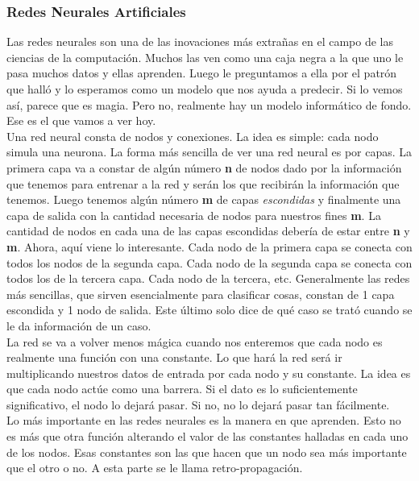 \documentclass[10pt,letterpaper]{article}
\begin{document}
\subsubsection{Redes Neurales Artificiales}
Las redes neurales son una de las inovaciones m\'as extra\~nas en el campo de las ciencias de la computaci\'on. Muchos las ven como una caja negra a la que uno le pasa muchos datos y ellas aprenden. Luego le preguntamos a ella por el patr\'on que hall\'o y lo esperamos como un modelo que nos ayuda a predecir. Si lo vemos as\'i, parece que es magia. Pero no, realmente hay un modelo inform\'atico de fondo. Ese es el que vamos a ver hoy.\\

Una red neural consta de nodos y conexiones. La idea es simple: cada nodo simula una neurona. La forma m\'as sencilla de ver una red neural es por capas. La primera capa va a constar de alg\'un n\'umero \textbf{n} de nodos dado por la informaci\'on que tenemos para entrenar a la red y ser\'an los que recibir\'an la informaci\'on que tenemos. Luego tenemos alg\'un n\'umero \textbf{m} de capas \emph{escondidas} y finalmente una capa de salida con la cantidad necesaria de nodos para nuestros fines \textbf{m}. La cantidad de nodos en cada una de las capas escondidas deber\'ia de estar entre \textbf{n} y \textbf{m}. Ahora, aqu\'i viene lo interesante. Cada nodo de la primera capa se conecta con todos los nodos de la segunda capa. Cada nodo de la segunda capa se conecta con todos los de la tercera capa. Cada nodo de la tercera, etc. Generalmente las redes m\'as sencillas, que sirven esencialmente para clasificar cosas, constan de 1 capa escondida y 1 nodo de salida. Este \'ultimo solo dice de qu\'e caso se trat\'o cuando se le da informaci\'on de un caso.\\

La red se va a volver menos m\'agica cuando nos enteremos que cada nodo es realmente una funci\'on con una constante. Lo que har\'a la red ser\'a ir multiplicando nuestros datos de entrada por cada nodo y su constante. La idea es que cada nodo act\'ue como una barrera. Si el dato es lo suficientemente significativo, el nodo lo dejar\'a pasar. Si no, no lo dejar\'a pasar tan f\'acilmente.\\

Lo m\'as importante en las redes neurales es la manera en que aprenden. Esto no es m\'as que otra funci\'on alterando el valor de las constantes halladas en cada uno de los nodos. Esas constantes son las que hacen que un nodo sea m\'as importante que el otro o no. A esta parte se le llama retro-propagaci\'on.\\
\end{document}
